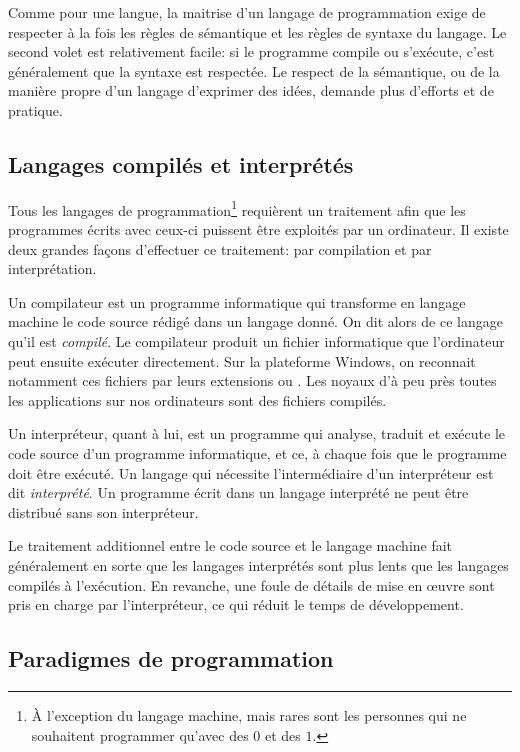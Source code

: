 Comme pour une langue, la maitrise d'un langage de programmation exige
de respecter à la fois les règles de sémantique et les règles de
syntaxe du langage. Le second volet est relativement facile: si le
programme compile ou s'exécute, c'est généralement que la syntaxe est
respectée. Le respect de la sémantique, ou de la manière propre d'un
langage d'exprimer des idées, demande plus d'efforts et de pratique.


\subsection{Langages compilés et interprétés}
\label{sec:informatique:concepts:compile_vs_interprete}

Tous les langages de programmation\footnote{%
  À l'exception du langage machine, mais rares sont les personnes qui
  ne souhaitent programmer qu'avec des $0$ et des $1$.} %
requièrent un traitement afin que les programmes écrits avec ceux-ci
puissent être exploités par un ordinateur. Il existe deux grandes
façons d'effectuer ce traitement: par compilation et par
interprétation.

Un compilateur est un programme informatique qui
transforme en langage machine le code source rédigé dans un langage
donné. On dit alors de ce langage qu'il est \emph{compilé}. Le compilateur produit un fichier
informatique que l'ordinateur peut ensuite exécuter directement. Sur
la plateforme Windows, on reconnait notamment ces fichiers par leurs
extensions  ou . Les noyaux d'à peu près toutes
les applications sur nos ordinateurs sont des fichiers compilés.

Un interpréteur, quant à lui, est un programme qui
analyse, traduit et exécute le code source d'un programme
informatique, et ce, à chaque fois que le programme doit être exécuté.
Un langage qui nécessite l'intermédiaire d'un interpréteur est dit
\emph{interprété}. Un programme écrit dans un langage interprété ne peut être distribué sans son
interpréteur.

Le traitement additionnel entre le code source et le langage machine
fait généralement en sorte que les langages interprétés sont plus
lents que les langages compilés à l'exécution. En revanche, une foule
de détails de mise en œuvre sont pris en charge par l'interpréteur, ce
qui réduit le temps de développement.


\subsection{Paradigmes de programmation}
\label{sec:informatique:concepts:paradigmes}

